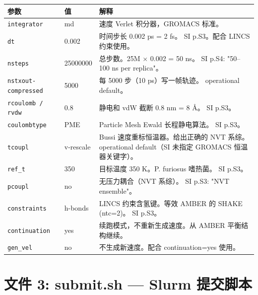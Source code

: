 \documentclass[11pt,a4paper]{article}
\begin{document}
\vspace{5pt}

\begin{tabular}{@{}p{3.5cm}p{2cm}p{7.5cm}@{}}
\toprule
\textbf{参数} & \textbf{值} & \textbf{解释} \\
\midrule
\texttt{integrator} & md & \textcolor{notecolor}{速度 Verlet 积分器，GROMACS 标准。} \\[2pt]
\texttt{dt} & 0.002 & \textcolor{notecolor}{时间步长 0.002 ps = 2 fs。} \textcolor{sourcecolor}{SI p.S3。配合 LINCS 约束使用。} \\[2pt]
\texttt{nsteps} & 25000000 & \textcolor{notecolor}{总步数。25M $\times$ 0.002 = 50 ns。} \textcolor{sourcecolor}{SI p.S4: "50--100 ns per replica"。} \\[2pt]
\texttt{nstxout-compressed} & 5000 & \textcolor{notecolor}{每 5000 步（10 ps）写一帧轨迹。} \textcolor{iocolor}{operational default。} \\[2pt]
\texttt{rcoulomb / rvdw} & 0.8 & \textcolor{notecolor}{静电和 vdW 截断 0.8 nm = 8 \AA。} \textcolor{sourcecolor}{SI p.S3。} \\[2pt]
\texttt{coulombtype} & PME & \textcolor{notecolor}{Particle Mesh Ewald 长程静电算法。} \textcolor{sourcecolor}{SI p.S3。} \\[2pt]
\texttt{tcoupl} & v-rescale & \textcolor{notecolor}{Bussi 速度重标恒温器。给出正确的 NVT 系综。} \textcolor{iocolor}{operational default（SI 未指定 GROMACS 恒温器关键字）。} \\[2pt]
\texttt{ref\_t} & 350 & \textcolor{notecolor}{目标温度 350 K。P. furiosus 嗜热菌。} \textcolor{sourcecolor}{SI p.S3。} \\[2pt]
\texttt{pcoupl} & no & \textcolor{notecolor}{无压力耦合（NVT 系综）。} \textcolor{sourcecolor}{SI p.S3: "NVT ensemble"。} \\[2pt]
\texttt{constraints} & h-bonds & \textcolor{notecolor}{LINCS 约束含氢键。等效 AMBER 的 SHAKE (ntc=2)。} \textcolor{sourcecolor}{SI p.S3。} \\[2pt]
\texttt{continuation} & yes & \textcolor{notecolor}{续跑模式，不重新生成速度。从 AMBER 平衡结构继续。} \\[2pt]
\texttt{gen\_vel} & no & \textcolor{notecolor}{不生成新速度。配合 continuation=yes 使用。} \\
\bottomrule
\end{tabular}

\newpage
\section{文件 3: submit.sh — Slurm 提交脚本}
\end{document}
